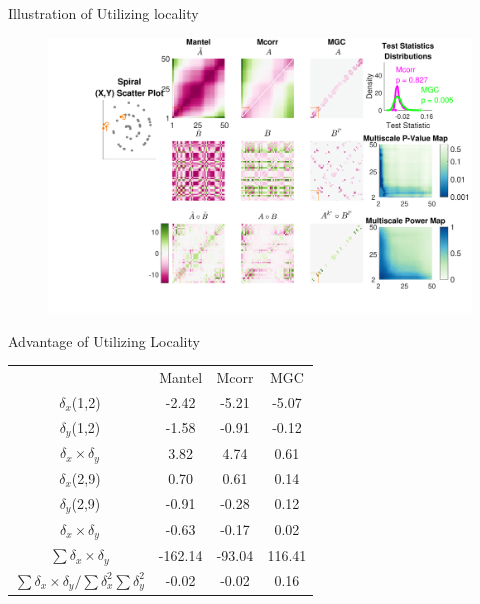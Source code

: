 \documentclass{beamer}
\begin{document}
\begin{frame}{Illustration of Utilizing locality}
\begin{figure}[htbp]
\includegraphics[width=1.0\textwidth]{../Figures/FigA}
\end{figure}
\end{frame}

\begin{frame}{Advantage of Utilizing Locality}
\begin{tabular}{c  c  c  c}
 & Mantel & Mcorr & MGC \\
 $\delta_x$(1,2) & \hspace{1.8em} \color{magenta}-2.42 \hspace{1.8em}  & \hspace{1.8em} \color{magenta}-5.21 \hspace{1.8em} & \hspace{1.8em} \color{magenta}-5.07 \hspace{1.8em}  \\ 
 $\delta_y$(1,2) & \color{magenta}-1.58 & \color{magenta}-0.91 & \color{magenta}-0.12  \\ 
 $\delta_x \times \delta_y$ & \color{green}3.82 & \color{green}4.74 & \color{green}0.61  \\ 
 
\hline


 $\delta_x$(2,9) & \color{green}0.70 & \color{green}0.61 & \color{green}0.14  \\ 
 $\delta_y$(2,9) &  \color{magenta}-0.91 & \color{magenta}-0.28 & \color{green}0.12  \\ 
 $\delta_x \times \delta_y$ & \color{magenta}-0.63 & \color{magenta}-0.17 & \color{green}0.02  \\ 

\hline
 $\sum{\delta_x \times \delta_y}$ & \color{magenta}-162.14   & \color{magenta}-93.04 & \color{green}116.41  \\ 
$\sum{\delta_x \times \delta_y} / \sum{\delta_{x}^2}\sum{\delta_{y}^2}$ &  \color{magenta}-0.02  & \color{magenta}-0.02 & \color{green}0.16  \\ 

\end{tabular}
\end{frame}
\end{document}
